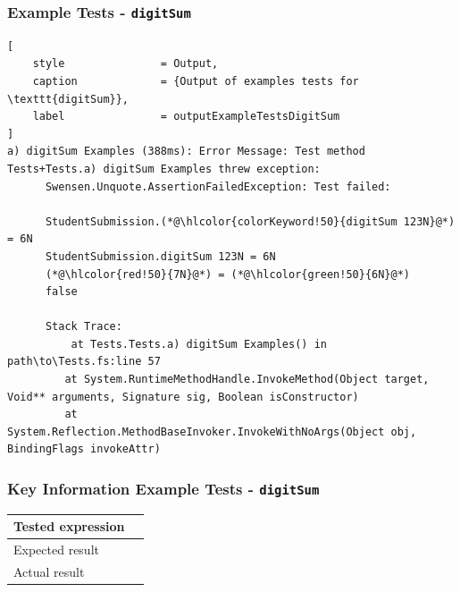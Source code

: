 \newpage %
\subsubsection{Example Tests - \texttt{digitSum}} %







\begin{lstlisting}[
	style 				= Output,
	caption				= {Output of examples tests for \texttt{digitSum}},
	label				= outputExampleTestsDigitSum
]
a) digitSum Examples (388ms): Error Message: Test method Tests+Tests.a) digitSum Examples threw exception:
      Swensen.Unquote.AssertionFailedException: Test failed:

      StudentSubmission.(*@\hlcolor{colorKeyword!50}{digitSum 123N}@*) = 6N
      StudentSubmission.digitSum 123N = 6N
      (*@\hlcolor{red!50}{7N}@*) = (*@\hlcolor{green!50}{6N}@*)
      false

      Stack Trace:
          at Tests.Tests.a) digitSum Examples() in path\to\Tests.fs:line 57
         at System.RuntimeMethodHandle.InvokeMethod(Object target, Void** arguments, Signature sig, Boolean isConstructor)
         at System.Reflection.MethodBaseInvoker.InvokeWithNoArgs(Object obj, BindingFlags invokeAttr)
\end{lstlisting}


\subsubsection{Key Information Example Tests - \texttt{digitSum}} %


\begin{center}
	\begin{tabular}{|l|l|}\hline
		Tested expression & \texttt{\hlcolor{colorKeyword!50}{digitSum 123N}}\\ \hline
		Expected result & \texttt{\hlcolor{green!50}{6N}}\\ \hline
		Actual result & \texttt{\hlcolor{red!50}{7N}}\\ \hline
	\end{tabular}
\end{center}


